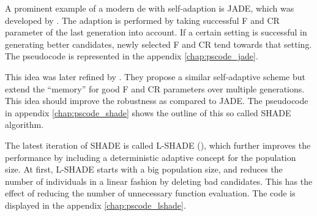 \documentclass[./\jobname.tex,hidelinks]{subfiles}
\begin{document}
A prominent example of a modern \gls{de} with self-adaption is JADE, which was developed by \cite{zhang_jade_2009}. The adaption is performed by taking successful F and CR parameter of the last generation into account. If a certain setting is successful in generating better candidates, newly selected F and CR tend towards that setting. The pseudocode is represented in the appendix \ref{chap:pscode_jade}. 

This idea was later refined by \cite{tanabe_success-history_2013}. They propose a similar self-adaptive scheme but extend the ``memory'' for good F and CR parameters over multiple generations. This idea should improve the robustness as compared to JADE. The pseudocode in appendix \ref{chap:pscode_shade} shows the outline of this so called SHADE algorithm. 

The latest iteration of SHADE is called L-SHADE (\cite{tanabe_improving_2014}), which further improves the performance by including a deterministic adaptive concept for the population size. At first, L-SHADE starts with a big population size, and reduces the number of individuals in a linear fashion by deleting bad candidates. This has the effect of reducing the number of unnecessary function evaluation. The code is displayed in the appendix \ref{chap:pscode_lshade}. 
\end{document}
